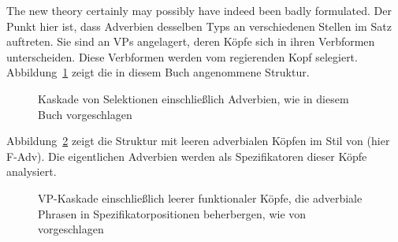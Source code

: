 \eanoraggedright
The new theory certainly may possibly have indeed been badly formulated.
\z
Der Punkt hier ist, dass Adverbien desselben Typs an verschiedenen Stellen im Satz auftreten. Sie sind
an VPs angelagert, deren Köpfe sich in ihren Verbformen unterscheiden. Diese Verbformen werden vom regierenden
Kopf selegiert. Abbildung~\ref{fig-verbal-selection} zeigt die in diesem Buch angenommene Struktur.
\begin{figure}
\caption{Kaskade von Selektionen einschließlich Adverbien, wie in diesem Buch vorgeschlagen}\label{fig-verbal-selection}
\end{figure}
Abbildung~\ref{fig-Cinque-AdvP-VP-selection} zeigt die Struktur mit leeren adverbialen Köpfen im Stil von \citeauthor{Cinque99a-u}
(hier F-Adv). Die eigentlichen Adverbien werden als Spezifikatoren dieser Köpfe analysiert.
\begin{figure}[htb]
\caption{VP-Kaskade einschließlich leerer funktionaler Köpfe, die adverbiale Phrasen in Spezifikatorpositionen
  beherbergen, wie von \citet{Cinque99a-u} vorgeschlagen}\label{fig-Cinque-AdvP-VP-selection}
\end{figure}

